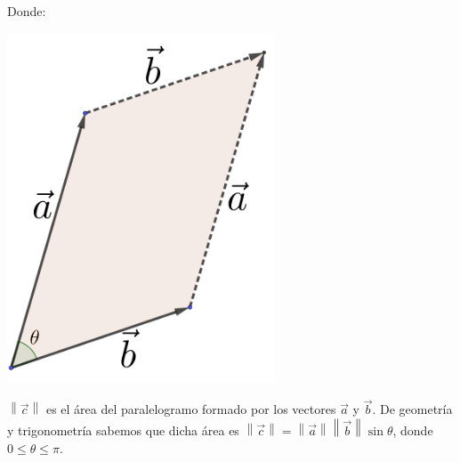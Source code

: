 \documentclass[12pt, fleqn]{report}                             %
\theoremstyle{break}                                            %
\newcommand{\Abs}[1]{\left\lVert #1 \right\lVert}               %
\begin{document}
                Donde: 

                \begin{minipage}{0.30\textwidth}
                    \includegraphics[width=0.60\textwidth]{parallelogram}
                \end{minipage}
                \begin{minipage}[t]{.65\textwidth}

                    $\Abs{\vec{c}}$ es el área del paralelogramo formado por los vectores $\vec{a}$ y $\vec{b}$.
                    De geometría y trigonometría sabemos que dicha área es 
                    $\Abs{\vec{c}} = \Abs{\vec{a}} \Abs{\vec{b}} \sin \theta$, donde $0 \leq \theta \leq \pi$.

                \end{minipage}

                \vspace{2em}
                
\end{document}
